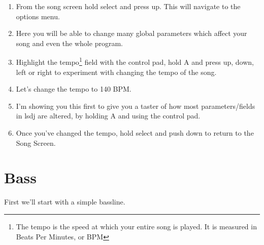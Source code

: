\documentclass[]{article}
\begin{document}

\begin{enumerate}



\item From the song screen hold select and press up. This will navigate to the options menu.

\item Here you will be able to change many global parameters which affect your song and even the whole program.

\item Highlight the tempo\footnote{The tempo is the speed at which your entire song is played. It is measured in Beats Per Minutes, or BPM} field with the control pad, hold A and press up, down, left or right to experiment with changing the tempo of the song.

\item Let's change the tempo to 140 BPM.

\item I'm showing you this first to give you a taster of how most parameters/fields in lsdj are altered, by holding A and using the control pad.

\item Once you've changed the tempo, hold select and push down to return to the Song Screen.
\end{enumerate}

\section{Bass}

First we’ll start with a simple bassline.
\end{document}

